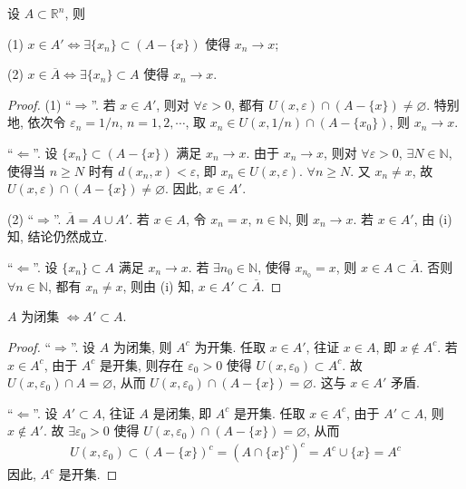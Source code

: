 \documentclass[../../main.tex]{subfiles}
\begin{document}
\begin{proposition}\label{proposition:一个点在导集或闭包中的充要条件}
设 $A \subset \mathbb{R}^n$, 则

(1) $x \in A' \Leftrightarrow \exists \{x_n\} \subset (A - \{x\})$ 使得 $x_n \to x$;

(2) $x \in \overline{A} \Leftrightarrow \exists \{x_n\} \subset A$ 使得 $x_n \to x$.
\end{proposition}
\begin{proof}
(1) “$\Rightarrow$”. 若 $x \in A'$, 则对 $\forall \varepsilon > 0$, 都有 $U(x, \varepsilon) \cap (A - \{x\}) \neq \varnothing$. 特别地, 依次令 $\varepsilon_n = 1/n$, $n = 1, 2, \cdots$, 取 $x_n \in U(x, 1/n) \cap (A - \{x_0\})$, 则 $x_n \to x$.

“$\Leftarrow$”. 设 $\{x_n\} \subset (A - \{x\})$ 满足 $x_n \to x$. 由于 $x_n \to x$, 则对 $\forall \varepsilon > 0$, $\exists N \in \mathbb{N}$, 使得当 $n \geqslant N$ 时有 $d(x_n, x) < \varepsilon$, 即 $x_n \in U(x, \varepsilon)$. $\forall n \geqslant N$. 又 $x_n \neq x$, 故 $U(x, \varepsilon) \cap (A - \{x\}) \neq \varnothing$. 因此, $x \in A'$. 

(2) “$\Rightarrow$”. $\overline{A} = A \cup A'$. 若 $x \in A$, 令 $x_n = x$, $n \in \mathbb{N}$, 则 $x_n \to x$. 若 $x \in A'$, 由 (i) 知, 结论仍然成立.

“$\Leftarrow$”. 设 $\{x_n\} \subset A$ 满足 $x_n \to x$. 若 $\exists n_0 \in \mathbb{N}$, 使得 $x_{n_0} = x$, 则 $x \in A \subset \overline{A}$. 否则 $\forall n \in \mathbb{N}$, 都有 $x_n \neq x$, 则由 (i) 知, $x \in A' \subset \overline{A}$.
\end{proof}

\begin{theorem}
$A$ 为闭集 $\Leftrightarrow A' \subset A$.
\end{theorem}
\begin{proof}
“$\Rightarrow$”. 设 $A$ 为闭集, 则 $A^c$ 为开集. 任取 $x \in A'$, 往证 $x \in A$, 即 $x \notin A^c$. 若 $x \in A^c$, 由于 $A^c$ 是开集, 则存在 $\varepsilon_0 > 0$ 使得 $U(x, \varepsilon_0) \subset A^c$. 故 $U(x, \varepsilon_0) \cap A = \varnothing$, 从而 $U(x, \varepsilon_0) \cap (A - \{x\}) = \varnothing$. 这与 $x \in A'$ 矛盾.

“$\Leftarrow$”. 设 $A' \subset A$, 往证 $A$ 是闭集, 即 $A^c$ 是开集. 任取 $x \in A^c$, 由于 $A' \subset A$, 则 $x \notin A'$. 故 $\exists \varepsilon_0 > 0$ 使得 $U(x, \varepsilon_0) \cap (A - \{x\}) = \varnothing$, 从而
\begin{align*}
U(x, \varepsilon_0) \subset (A - \{x\})^c = (A \cap \{x\}^c)^c = A^c \cup \{x\} = A^c
\end{align*}
因此, $A^c$ 是开集.
\end{proof}
\end{document}
